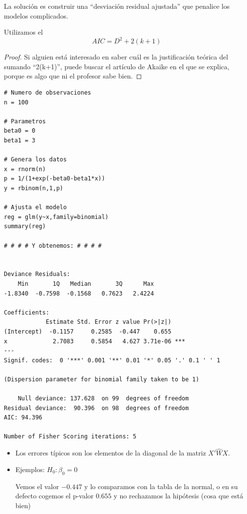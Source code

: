 \begin{enumerate}
  La solución es construir una ``desviación residual ajustada'' que penalice los modelos complicados.

  \subitem Utilizamos el  
\label{def:AIC}
    \[AIC = D^2 + 2(k+1)\]

    \begin{proof}
      Si alguien está interesado en saber cuál es la justificación teórica del sumando ``2(k+1)'', puede buscar el artículo de Akaike en el que se explica, porque es algo que ni el profesor sabe bien.
    \end{proof}
\end{enumerate}

\begin{example}

\begin{lstlisting}[style=mystyle]
# Numero de observaciones
n = 100

# Parametros
beta0 = 0
beta1 = 3

# Genera los datos
x = rnorm(n)
p = 1/(1+exp(-beta0-beta1*x))
y = rbinom(n,1,p)

# Ajusta el modelo
reg = glm(y~x,family=binomial)
summary(reg)

# # # # Y obtenemos: # # # #


Deviance Residuals:
    Min       1Q   Median       3Q      Max
-1.8340  -0.7598  -0.1568   0.7623   2.4224

Coefficients:
            Estimate Std. Error z value Pr(>|z|)
(Intercept)  -0.1157     0.2585  -0.447    0.655
x             2.7083     0.5854   4.627 3.71e-06 ***
---
Signif. codes:  0 '***' 0.001 '**' 0.01 '*' 0.05 '.' 0.1 ' ' 1

(Dispersion parameter for binomial family taken to be 1)

    Null deviance: 137.628  on 99  degrees of freedom
Residual deviance:  90.396  on 98  degrees of freedom
AIC: 94.396

Number of Fisher Scoring iterations: 5

\end{lstlisting}

\begin{itemize}
  \item Los errores típicos son los elementos de la diagonal de la matriz $X'\hat{W}X$.
  \item Ejemplos:
  \subitem $H_0 : β_0 = 0$

  Vemos el valor $-0.447$ y lo comparamos con la tabla de la normal, o en su defecto cogemos el p-valor $0.655$ y no rechazamos la hipótesis (cosa que está bien)


\end{itemize}
\end{example}
